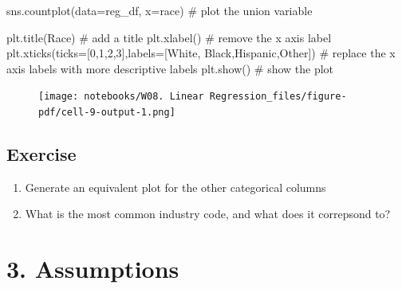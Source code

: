 \documentclass[
  letterpaper,
  DIV=11,
  numbers=noendperiod]{scrreprt}
\newenvironment{Shaded}{\begin{snugshade}}{\end{snugshade}}
\newcommand{\CommentTok}[1]{\textcolor[rgb]{0.37,0.37,0.37}{#1}}
\newcommand{\DecValTok}[1]{\textcolor[rgb]{0.68,0.00,0.00}{#1}}
\newcommand{\NormalTok}[1]{\textcolor[rgb]{0.00,0.23,0.31}{#1}}
\newcommand{\OperatorTok}[1]{\textcolor[rgb]{0.37,0.37,0.37}{#1}}
\newcommand{\StringTok}[1]{\textcolor[rgb]{0.13,0.47,0.30}{#1}}
\providecommand{\tightlist}{%
  \setlength{\itemsep}{0pt}\setlength{\parskip}{0pt}}\usepackage{longtable,booktabs,array}
\begin{document}
\begin{Shaded}
\begin{Highlighting}[]
\NormalTok{sns.countplot(data}\OperatorTok{=}\NormalTok{reg\_df, x}\OperatorTok{=}\StringTok{\textquotesingle{}race\textquotesingle{}}\NormalTok{) }\CommentTok{\# plot the union variable}

\NormalTok{plt.title(}\StringTok{\textquotesingle{}Race\textquotesingle{}}\NormalTok{) }\CommentTok{\# add a title}
\NormalTok{plt.xlabel(}\StringTok{\textquotesingle{}\textquotesingle{}}\NormalTok{) }\CommentTok{\# remove the x axis label}
\NormalTok{plt.xticks(ticks}\OperatorTok{=}\NormalTok{[}\DecValTok{0}\NormalTok{,}\DecValTok{1}\NormalTok{,}\DecValTok{2}\NormalTok{,}\DecValTok{3}\NormalTok{],labels}\OperatorTok{=}\NormalTok{[}\StringTok{\textquotesingle{}White\textquotesingle{}}\NormalTok{, }\StringTok{\textquotesingle{}Black\textquotesingle{}}\NormalTok{,}\StringTok{\textquotesingle{}Hispanic\textquotesingle{}}\NormalTok{,}\StringTok{\textquotesingle{}Other\textquotesingle{}}\NormalTok{]) }\CommentTok{\# replace the x axis labels with more descriptive labels}
\NormalTok{plt.show() }\CommentTok{\# show the plot}
\end{Highlighting}
\end{Shaded}

\begin{figure}[H]

{\centering \texttt{[image: notebooks/W08. Linear Regression\_files/figure-pdf/cell-9-output-1.png]}

}

\end{figure}

\hypertarget{exercise-23}{%
\subsection{Exercise}\label{exercise-23}}

\begin{enumerate}
\def\labelenumi{\arabic{enumi}.}
\tightlist
\item
  Generate an equivalent plot for the other categorical columns
\item
  What is the most common industry code, and what does it correpsond to?
\end{enumerate}

\hypertarget{assumptions}{%
\section{3. Assumptions}\label{assumptions}}
\end{document}
